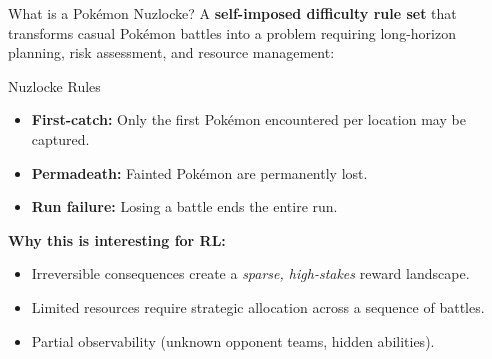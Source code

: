 \documentclass[aspectratio=169, 11pt]{beamer}
\begin{document}
\begin{frame}{What is a Pok\'{e}mon Nuzlocke?}
  A \textbf{self-imposed difficulty rule set} that transforms casual Pok\'{e}mon
  battles into a problem requiring long-horizon planning, risk assessment, and
  resource management:

  \vspace{0.5em}
  \begin{block}{Nuzlocke Rules}
    \begin{itemize}
      \item \textbf{First-catch:} Only the first Pok\'{e}mon encountered per
            location may be captured.
      \item \textbf{Permadeath:} Fainted Pok\'{e}mon are permanently lost.
      \item \textbf{Run failure:} Losing a battle ends the entire run.
    \end{itemize}
  \end{block}

  \vspace{0.5em}
  \textbf{Why this is interesting for RL:}
  \begin{itemize}
    \item Irreversible consequences create a \emph{sparse, high-stakes} reward
          landscape.
    \item Limited resources require strategic allocation across a sequence of
          battles.
    \item Partial observability (unknown opponent teams, hidden abilities).
  \end{itemize}
\end{frame}
\end{document}
